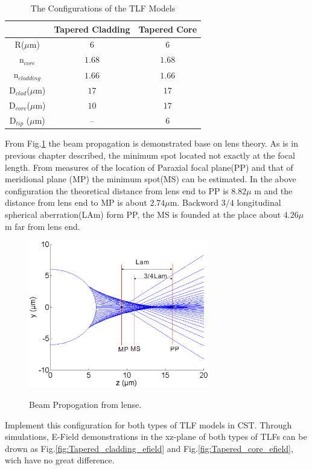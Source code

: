 \begin{table}
\caption{The Configurations of the TLF Models}
\centering
\begin{tabular}{ccc}
\hline
							&Tapered Cladding&Tapered Core\\
\hline
R($\mu$m) & $6$						 &$6$	\\
n$_{core}$&$1.68$&$1.68$\\
n$_{cladding}$&$1.66$&$1.66$\\
D$_{clad}$($\mu$m) &	$17$ &	$17$\\
D$_{core}$($\mu$m) & $10$ &	$17$\\
D$_{tip}$ ($\mu$m) & --   &	$6$\\
\hline
\end{tabular}
\label{tab:model_fiber_configuration}
\end{table}
From Fig.\quad\ref{fig:lens_spot} the beam propagation is demonstrated base on lens theory. As is in previous chapter described, the minimum spot located not exactly at the focal length. From measures of the location of Paraxial focal plane(PP) and that of meridional plane (MP) the minimum spot(MS) can be estimated. In the above configuration the theoretical distance from lens end to PP is $8.82 \mu$ m and the distance from lens end to MP is about $2.74 \mu$m. Backword $3/4$ longitudinal spherical aberration(LAm) form PP, the MS is founded at the place about $4.26 \mu$m far from lens end. 
\begin{figure}
\centering
	\includegraphics[width=0.7\textwidth]{bilder/cal_min_spot}
\label{fig:lens_spot}
\caption{Beam Propogation from lense.}
\end{figure}
Implement this configuration for both types of TLF models in CST. Through simulations, E-Field demonstrations in the xz-plane of both types of TLFs can be drown as Fig.\quad\ref{fig:Tapered_cladding_efield} and  Fig.\quad\ref{fig:Tapered_core_efield}, wich have no great difference.

